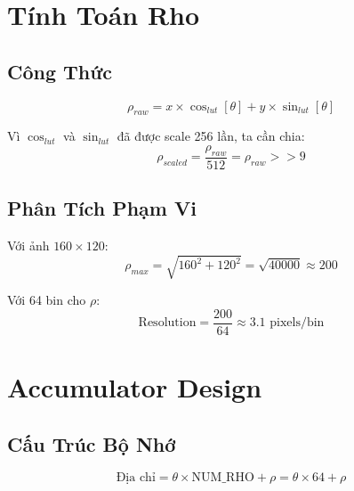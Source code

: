 \documentclass[12pt,a4paper]{report}
\begin{document}
\section{Tính Toán Rho}

\subsection{Công Thức}
\begin{equation}
    \rho_{raw} = x \times \cos_{lut}[\theta] + y \times \sin_{lut}[\theta]
\end{equation}

Vì $\cos_{lut}$ và $\sin_{lut}$ đã được scale 256 lần, ta cần chia:
\begin{equation}
    \rho_{scaled} = \frac{\rho_{raw}}{512} = \rho_{raw} >> 9
\end{equation}

\subsection{Phân Tích Phạm Vi}
Với ảnh $160 \times 120$:
\begin{equation}
    \rho_{max} = \sqrt{160^2 + 120^2} = \sqrt{40000} \approx 200
\end{equation}

Với 64 bin cho $\rho$:
\begin{equation}
    \text{Resolution} = \frac{200}{64} \approx 3.1 \text{ pixels/bin}
\end{equation}

\section{Accumulator Design}

\subsection{Cấu Trúc Bộ Nhớ}
\begin{equation}
    \text{Địa chỉ} = \theta \times \text{NUM\_RHO} + \rho = \theta \times 64 + \rho
\end{equation}
\end{document}
